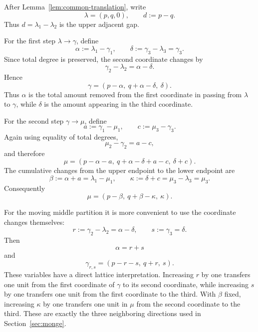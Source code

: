 \documentclass[11pt]{article}
\theoremstyle{definition}
\begin{document}
After Lemma~\ref{lem:common-translation}, write
\begin{equation*}
\lambda=(p,q,0),
\qquad
d:=p-q.
\end{equation*}
Thus \(d=\lambda_1-\lambda_2\) is the upper adjacent gap.

For the first step \(\lambda\to\gamma\), define
\begin{equation*}
\alpha:=\lambda_1-\gamma_1,
\qquad
\delta:=\gamma_3-\lambda_3=\gamma_3.
\end{equation*}
Since total degree is preserved, the second coordinate changes by
\begin{equation*}
\gamma_2-\lambda_2=\alpha-\delta.
\end{equation*}
Hence
\begin{equation*}
\gamma
=
(p-\alpha,\ q+\alpha-\delta,\ \delta).
\end{equation*}
Thus \(\alpha\) is the total amount removed from the first coordinate in passing from
\(\lambda\) to \(\gamma\), while \(\delta\) is the amount appearing in the third coordinate.

For the second step \(\gamma\to\mu\), define
\begin{equation*}
a:=\gamma_1-\mu_1,
\qquad
c:=\mu_3-\gamma_3.
\end{equation*}
Again using equality of total degrees,
\begin{equation*}
\mu_2-\gamma_2=a-c,
\end{equation*}
and therefore
\begin{equation*}
\mu
=
(p-\alpha-a,\ q+\alpha-\delta+a-c,\ \delta+c).
\end{equation*}
The cumulative changes from the upper endpoint to the lower endpoint are
\begin{equation*}
\beta:=\alpha+a=\lambda_1-\mu_1,
\qquad
\kappa:=\delta+c=\mu_3-\lambda_3=\mu_3.
\end{equation*}
Consequently
\begin{equation*}
\mu
=
(p-\beta,\ q+\beta-\kappa,\ \kappa).
\end{equation*}

For the moving middle partition it is more convenient to use the coordinate changes themselves:
\begin{equation*}
r:=\gamma_2-\lambda_2=\alpha-\delta,
\qquad
s:=\gamma_3=\delta.
\end{equation*}
Then
\begin{equation*}
\alpha=r+s
\end{equation*}
and
\begin{equation*}
\gamma_{r,s}
=
(p-r-s,\ q+r,\ s).
\end{equation*}
These variables have a direct lattice interpretation.  Increasing \(r\) by one transfers one unit from the first coordinate of \(\gamma\) to its second coordinate, while increasing \(s\) by one transfers one unit from the first coordinate to the third.  With \(\beta\) fixed, increasing \(\kappa\) by one transfers one unit in \(\mu\) from the second coordinate to the third.  These are exactly the three neighboring directions used in Section~\ref{sec:monge}.
\end{document}
